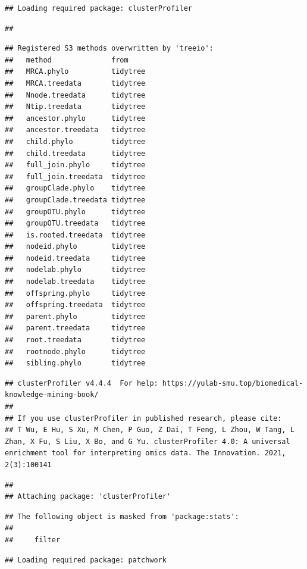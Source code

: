 \documentclass[
  12pt,
]{book}
\begin{document}
\begin{verbatim}
## Loading required package: clusterProfiler
\end{verbatim}

\begin{verbatim}
## 
\end{verbatim}

\begin{verbatim}
## Registered S3 methods overwritten by 'treeio':
##   method              from    
##   MRCA.phylo          tidytree
##   MRCA.treedata       tidytree
##   Nnode.treedata      tidytree
##   Ntip.treedata       tidytree
##   ancestor.phylo      tidytree
##   ancestor.treedata   tidytree
##   child.phylo         tidytree
##   child.treedata      tidytree
##   full_join.phylo     tidytree
##   full_join.treedata  tidytree
##   groupClade.phylo    tidytree
##   groupClade.treedata tidytree
##   groupOTU.phylo      tidytree
##   groupOTU.treedata   tidytree
##   is.rooted.treedata  tidytree
##   nodeid.phylo        tidytree
##   nodeid.treedata     tidytree
##   nodelab.phylo       tidytree
##   nodelab.treedata    tidytree
##   offspring.phylo     tidytree
##   offspring.treedata  tidytree
##   parent.phylo        tidytree
##   parent.treedata     tidytree
##   root.treedata       tidytree
##   rootnode.phylo      tidytree
##   sibling.phylo       tidytree
\end{verbatim}

\begin{verbatim}
## clusterProfiler v4.4.4  For help: https://yulab-smu.top/biomedical-knowledge-mining-book/
## 
## If you use clusterProfiler in published research, please cite:
## T Wu, E Hu, S Xu, M Chen, P Guo, Z Dai, T Feng, L Zhou, W Tang, L Zhan, X Fu, S Liu, X Bo, and G Yu. clusterProfiler 4.0: A universal enrichment tool for interpreting omics data. The Innovation. 2021, 2(3):100141
\end{verbatim}

\begin{verbatim}
## 
## Attaching package: 'clusterProfiler'
\end{verbatim}

\begin{verbatim}
## The following object is masked from 'package:stats':
## 
##     filter
\end{verbatim}

\begin{verbatim}
## Loading required package: patchwork
\end{verbatim}
\end{document}
